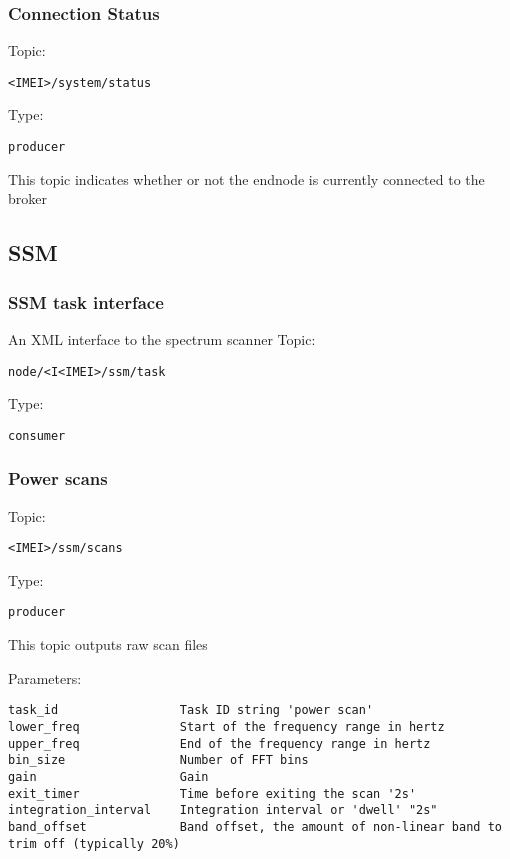 \subsubsection{Connection Status}

Topic:
\begin{lstlisting}<IMEI>/system/status\end{lstlisting}
Type:
\begin{lstlisting}producer\end{lstlisting}
    
This topic indicates whether or not the endnode is currently connected to the broker

\subsection{SSM}

\subsubsection{SSM task interface}
An XML interface to the spectrum scanner
Topic:
\begin{lstlisting}node/<I<IMEI>/ssm/task\end{lstlisting}
Type:
\begin{lstlisting}consumer\end{lstlisting}

\subsubsection{Power scans}
Topic:
\begin{lstlisting}<IMEI>/ssm/scans\end{lstlisting}
Type:
\begin{lstlisting}producer\end{lstlisting}
    
This topic outputs raw scan files

Parameters:

\begin{lstlisting}
task_id                 Task ID string 'power scan'
lower_freq              Start of the frequency range in hertz
upper_freq              End of the frequency range in hertz
bin_size                Number of FFT bins
gain                    Gain
exit_timer              Time before exiting the scan '2s'
integration_interval    Integration interval or 'dwell' "2s"
band_offset             Band offset, the amount of non-linear band to trim off (typically 20%)
\end{lstlisting}

